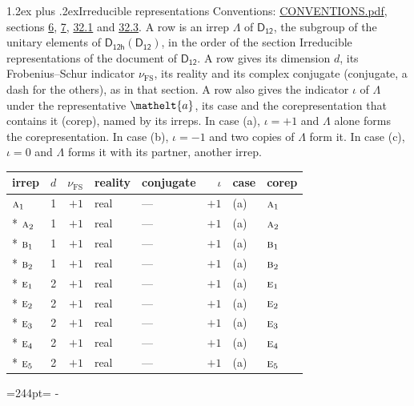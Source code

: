 \documentclass[10pt,a4paper]{article}
\makeatletter
\renewcommand\section{\@startsection{section}{1}{\z@}{-3ex plus -1ex minus -.2ex}%
  {1.2ex plus .2ex}{\normalfont\large\sffamily\bfseries\color{parttitle}}}
\newcommand{\needspace}[1]{\par\penalty-100\begingroup\dimen0=#1\relax\dimen2=\pagegoal
  \advance\dimen2-\pagetotal\ifdim\dimen0>\dimen2\relax\ifdim\dimen2>0pt\vfil\break\fi\fi
  \endgroup}
\numberwithin{equation}{section}
\newcommand{\eltfont}[1]{{\let\sigma\eltsigma\mathelt{#1}}}
\newcommand{\grp}[1]{\mathsf{#1}}
\newcommand{\irr}[1]{\text{\normalfont\scshape #1}}
\newcommand{\elt}[1]{\eltfont{#1}}
\newcommand{\fsind}{\nu_{\mathrm{FS}}}
\makeatother
\begin{document}
\section{Irreducible representations}\label{s:irreps}
Conventions: \href{../../CONVENTIONS.pdf}{CONVENTIONS.pdf}, sections \href{../../../rotation/CONVENTIONS.pdf\#conv.6}{6}, \href{../../../rotation/CONVENTIONS.pdf\#conv.7}{7}, \href{../../CONVENTIONS.pdf\#conv.32.1}{32.1} and \href{../../CONVENTIONS.pdf\#conv.32.3}{32.3}.
\leavevmode\label{n:irrep.Delta}A row is an irrep $\Lambda$ of $\grp{D_{12}}$, the subgroup of the unitary elements of $\grp{D_{12h}}(\grp{D_{12}})$, in the order of the section Irreducible representations of the document of \href{../../../rotation/data/pdf/D12.pdf}{$\grp{D_{12}}$}. \label{n:index.dimension}\label{n:index.frobenius}\label{n:head.irrep}\label{n:head.reality}\label{n:head.conjugate}A row gives its dimension $d$, its Frobenius--Schur indicator $\fsind$, its reality and its complex conjugate (conjugate, a dash for the others), as in that section. \label{n:head.case.corep}\label{n:head.corep}A row also gives the indicator $\iota$ of $\Lambda$ under the representative $\elt{a}$, its case and the corepresentation that contains it (corep), named by its irreps. In case (a), $\iota = +1$ and $\Lambda$ alone forms the corepresentation. In case (b), $\iota = -1$ and two copies of $\Lambda$ form it. In case (c), $\iota = 0$ and $\Lambda$ forms it with its partner, another irrep.
\setlength{\emergencystretch}{2em}\par\setlength{\emergencystretch}{0pt}
{\small\renewcommand{\arraystretch}{1.25}\setlength{\tabcolsep}{4pt}\begin{longtable}{@{}lrrllrll@{}}\toprule
irrep & $d$ & $\fsind$ & reality & conjugate & $\iota$ & case & corep\\\midrule\endhead
\bottomrule\endfoot\endlastfoot
$\irr{a}_{1}$ & 1 & $+1$ & real & --- & $+1$ & (a) & $\irr{a}_{1}$\\*
$\irr{a}_{2}$ & 1 & $+1$ & real & --- & $+1$ & (a) & $\irr{a}_{2}$\\*
$\irr{b}_{1}$ & 1 & $+1$ & real & --- & $+1$ & (a) & $\irr{b}_{1}$\\*
$\irr{b}_{2}$ & 1 & $+1$ & real & --- & $+1$ & (a) & $\irr{b}_{2}$\\*
$\irr{e}_{1}$ & 2 & $+1$ & real & --- & $+1$ & (a) & $\irr{e}_{1}$\\*
$\irr{e}_{2}$ & 2 & $+1$ & real & --- & $+1$ & (a) & $\irr{e}_{2}$\\*
$\irr{e}_{3}$ & 2 & $+1$ & real & --- & $+1$ & (a) & $\irr{e}_{3}$\\*
$\irr{e}_{4}$ & 2 & $+1$ & real & --- & $+1$ & (a) & $\irr{e}_{4}$\\*
$\irr{e}_{5}$ & 2 & $+1$ & real & --- & $+1$ & (a) & $\irr{e}_{5}$\\
\bottomrule\end{longtable}}
\needspace{244pt}
\end{document}
